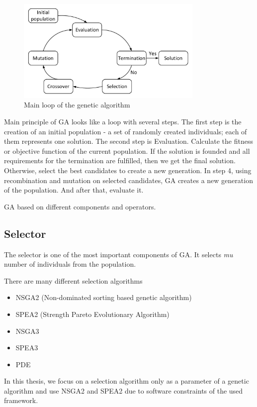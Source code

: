 \begin{figure}
	\centering
	\includegraphics[width=0.8\textwidth]{images/GeneticLoop}
	\caption[Main loop of the genetic algorithm]{Main loop of the genetic algorithm}
	\label{fig:GeneticLoop}
\end{figure}
Main principle of GA looks like a loop with several steps.
The first step is the creation of an initial population - a set of randomly created individuals; each of them represents one solution. 
The second step is Evaluation. Calculate the fitness or objective function of the current population.
If the solution is founded and all requirements for the termination are fulfilled, then we get the final solution. Otherwise, select the best candidates to create a new generation.
In step 4, using recombination and mutation on selected candidates, GA creates a new generation of the population. And after that, evaluate it.

GA based on different components and operators.
\subsection{Selector}\label{sec:GeneticAlgorithm:Selector}
The selector is one of the most important components of GA. It selects \textit{mu} number of individuals from the population.

There are many different selection algorithms
\begin{itemize}
	\item NSGA2 (Non-dominated sorting based genetic algorithm)
	\item SPEA2 (Strength Pareto Evolutionary Algorithm)
	\item NSGA3
	\item SPEA3
	\item PDE 
\end{itemize}
In this thesis, we focus on a selection algorithm only as a parameter of a genetic algorithm and use NSGA2 and SPEA2 due to software constraints of the used framework. 

